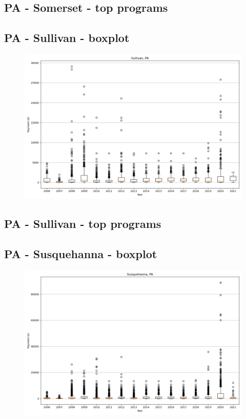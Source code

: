 \subsection*{PA - Somerset - top programs}

\newpage
\subsection*{PA - Sullivan - boxplot}
\begin{figure}[h]
\centering
\includegraphics[width=7in]{../output/boxplots/counties/Sullivan-PA_boxplot.png}
\end{figure}


\subsection*{PA - Sullivan - top programs}

\newpage
\subsection*{PA - Susquehanna - boxplot}
\begin{figure}[h]
\centering
\includegraphics[width=7in]{../output/boxplots/counties/Susquehanna-PA_boxplot.png}
\end{figure}


